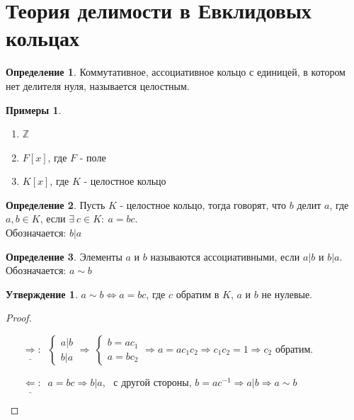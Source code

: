 \documentclass[a4paper, 12pt]{article}
\newcommand{\Z}{\mathbb Z}
\newcommand\tab[1][.5cm]{\hspace*{#1}}
\theoremstyle{definition}
\newtheorem*{definition}{Определение}
\newtheorem*{subtheorem}{Утверждение}
\newtheorem*{example}{Примеры}
\begin{document}
  \section{Теория делимости в Евклидовых кольцах}
  \begin{definition}
    Коммутативное, ассоциативное кольцо с единицей, в котором нет делителя нуля, называется целостным.
  \end{definition}
  \begin{example}\tab
    \begin{enumerate}
      \item $\Z$
      \item $F[x]$, где $F$ - поле
      \item $K[x]$, где $K$ - целостное кольцо     
    \end{enumerate}
  \end{example}
  \begin{definition}
    Пусть $K$ - целостное кольцо, тогда говорят, что $b$ делит $a$, где $a,b \in K$, если $\exists \ c \in K: \ a = bc$.\\
    Обозначается: $b|a$ 
  \end{definition}
  \begin{definition}
    Элементы $a$ и $b$ называются ассоциативными, если $a|b$ и $b|a$.\\
    Обозначается: $a \sim  b$ 
  \end{definition}
  \begin{subtheorem}
    $a\sim b \Longleftrightarrow a = bc$, где $c$ обратим в $K$, $a$ и $b$ не нулевые.   
  \end{subtheorem}
  \begin{proof}\tab
    \begin{itemize}
      \item[$\underline{\Longrightarrow }: \ $] $\begin{cases}
        a|b\\
        b|a
      \end{cases} \Longrightarrow \ \begin{cases}
        b = ac_1\\
        a = bc_2
      \end{cases} \Longrightarrow a = ac_1c_2 \Longrightarrow c_1c_2 =1 \Longrightarrow c_2$ обратим.
      \item[$\underline{\Longleftarrow}: \ $] $a=bc \Longrightarrow b|a$, \ с другой стороны, $b = ac^{-1} \Longrightarrow  a|b \Longrightarrow a \sim b$ 
    \end{itemize}
  \end{proof}
\end{document}
